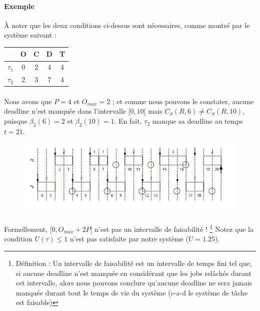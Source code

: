 \paragraph{Exemple} À noter que les deux conditions ci-dessus sont nécessaires, comme montré par le système suivant :
  \begin{center}
    \begin{tabular}{| l | c | c | c | c |}
      \hline
                    & O  &  C  & D  & T  \\
      \hline
       $\tau_{1}$   & 0  &  2  & 4  & 4  \\
      \hline
       $\tau_{2}$   & 2  &  3  & 7  & 4  \\
      \hline
  \end{tabular}
  \end{center}

\paragraph{}
Nous avons que $P = 4$ et $O_{max} = 2$ ; et comme nous pouvons le constater, aucune deadline n'est manquée dans l'intervalle $[0, 10[$ mais $C_{S}(R, 6) \neq C_{S}(R, 10)$, puisque $\beta_{2}(6) = 2$ et $\beta_{2}(10) = 1$. En fait, $\tau_{2}$ manque sa deadline au temps $t = 21$.

\begin{figure}[H]
\centering
\includegraphics[width=\textwidth]{img_2_17__0}
\end{figure}
\paragraph{} Formellement, $[0, O_{max} + 2P[$ n'est pas un intervalle de faisabilité ! \footnote{Définition : Un intervalle de faisabilité est un intervalle de temps fini tel que, si aucune deadline n'est manquée en considérant que les jobs relâchés durant cet intervalle, alors nous pouvons conclure qu'aucune deadline ne sera jamais manquée durant tout le temps de vie du système (c-a-d le système de tâche est faisable)} Notez que la condition $U(\tau) \leq 1$ n'est pas satisfaite par notre système ($U = 1.25$).
